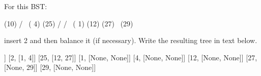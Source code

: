 \nextq
For this BST:
\begin{console}[fontsize=\footnotesize]
            (10)
          /      \
      ( 4)        (25)
     /           /    \
 ( 1)        (12)      (27)
                           \
                            (29)
\end{console}
insert 2 and then balance it (if necessary).
Write the resulting tree in text below.
\ANSWER
\begin{answercode}
[10, [4, 25]]
[2, [1, 4]]
[25, [12, 27]]
[1, [None, None]]
[4, [None, None]]
[12, [None, None]]
[27, [None, 29]]
[29, [None, None]]
\end{answercode}


